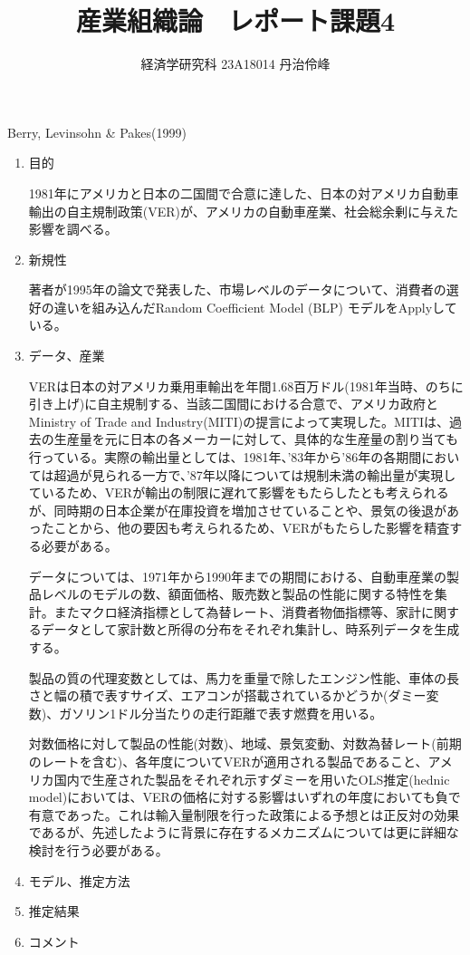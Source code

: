 \documentclass{jsarticle}
\begin{document}
\title{産業組織論　レポート課題4}
\author{経済学研究科 23A18014 丹治伶峰}
\date{}
\maketitle

Berry, Levinsohn \& Pakes(1999)

\begin{enumerate}

\item 目的

1981年にアメリカと日本の二国間で合意に達した、日本の対アメリカ自動車輸出の自主規制政策(VER)が、アメリカの自動車産業、社会総余剰に与えた影響を調べる。

\item 新規性

著者が1995年の論文で発表した、市場レベルのデータについて、消費者の選好の違いを組み込んだRandom Coefficient Model (BLP) モデルをApplyしている。

\item データ、産業

VERは日本の対アメリカ乗用車輸出を年間1.68百万ドル(1981年当時、のちに引き上げ)に自主規制する、当該二国間における合意で、アメリカ政府とMinistry of Trade and Industry(MITI)の提言によって実現した。MITIは、過去の生産量を元に日本の各メーカーに対して、具体的な生産量の割り当ても行っている。実際の輸出量としては、1981年、'83年から'86年の各期間においては超過が見られる一方で、'87年以降については規制未満の輸出量が実現しているため、VERが輸出の制限に遅れて影響をもたらしたとも考えられるが、同時期の日本企業が在庫投資を増加させていることや、景気の後退があったことから、他の要因も考えられるため、VERがもたらした影響を精査する必要がある。

\vspace{1zw}

データについては、1971年から1990年までの期間における、自動車産業の製品レベルのモデルの数、額面価格、販売数と製品の性能に関する特性を集計。またマクロ経済指標として為替レート、消費者物価指標等、家計に関するデータとして家計数と所得の分布をそれぞれ集計し、時系列データを生成する。

製品の質の代理変数としては、馬力を重量で除したエンジン性能、車体の長さと幅の積で表すサイズ、エアコンが搭載されているかどうか(ダミー変数)、ガソリン1ドル分当たりの走行距離で表す燃費を用いる。

\vspace{1zw}

対数価格に対して製品の性能(対数)、地域、景気変動、対数為替レート(前期のレートを含む)、各年度についてVERが適用される製品であること、アメリカ国内で生産された製品をそれぞれ示すダミーを用いたOLS推定(hednic model)においては、VERの価格に対する影響はいずれの年度においても負で有意であった。これは輸入量制限を行った政策による予想とは正反対の効果であるが、先述したように背景に存在するメカニズムについては更に詳細な検討を行う必要がある。

\item モデル、推定方法



\item 推定結果
 
\item コメント

\end{enumerate}
\end{document}
